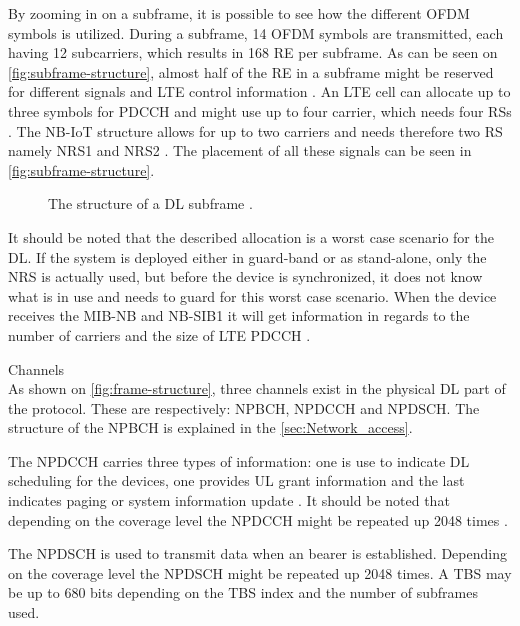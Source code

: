 By zooming in on a subframe, it is possible to see how the different \gls{OFDM} symbols is utilized. During a subframe, 14 \gls{OFDM} symbols are transmitted, each having 12 subcarriers, which results in 168 \gls{RE} per subframe. As can be seen on \autoref{fig:subframe-structure}, almost half of the \gls{RE} in a subframe might be reserved for different signals and \gls{LTE} control information \citep{REL-13}. An \gls{LTE} cell can allocate up to three symbols for \gls{PDCCH} and might use up to four carrier, which needs four \gls{RS}s \citep{whitepaper}. The \gls{NB-IoT} structure allows for up to two carriers and needs therefore two \gls{RS} namely \gls{NRS}1 and \gls{NRS}2 \citep{REL-13}. The placement of all these signals can be seen in \autoref{fig:subframe-structure}.  

\begin{figure}[H]
\centering

\caption{The structure of a \gls{DL} subframe \citep{whitepaper,REL-13}.}
\label{fig:subframe-structure}
\end{figure}

It should be noted that the described allocation is a worst case scenario for the \gls{DL}. If the system is deployed either in guard-band or as stand-alone, only the \gls{NRS} is actually used, but before the device is synchronized, it does not know what is in use and needs to guard for this worst case scenario. When the device receives the \gls{MIB-NB} and \gls{NB-SIB}1 it will get information in regards to the number of carriers and the size of \gls{LTE} \gls{PDCCH} \citep{whitepaper}. 

Channels\\ 
As shown on \autoref{fig:frame-structure}, three channels exist in the physical \gls{DL} part of the protocol. These are respectively: \gls{NPBCH}, \gls{NPDCCH} and \gls{NPDSCH}. The structure of the \gls{NPBCH} is explained in the \autoref{sec:Network_access}.

The \gls{NPDCCH} carries three types of information: one is use to indicate \gls{DL} scheduling for the devices, one provides \gls{UL} grant information and the last indicates paging or system information update \citep{NB-IoT_Book}. It should be noted that  depending on the coverage level the \gls{NPDCCH} might be repeated up 2048 times \citep{NB-IoT_Book}.

The \gls{NPDSCH} is used to transmit data when an bearer is established. Depending on the coverage level the \gls{NPDSCH} might be repeated up 2048 times. A \gls{TBS} may be up to 680 bits depending on the \gls{TBS} index and the number of subframes used. \citep{NB-IoT_Book}

